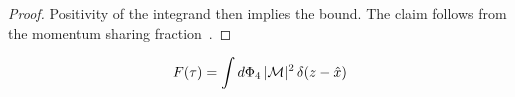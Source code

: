 \begin{proof}
Positivity of the integrand then implies the bound. The claim follows
from the momentum sharing
fraction~\cite{TPC:1653-LLAMA-Latent-Lorentz-Invariant-Angular-Ordered-Model-Agnostic-Amplitudes-September-25-2026}.
\end{proof}

\begin{equation}
  F(\tau) = \int d\Phi_{4} \, |\mathcal{M}|^2 \, \delta(z - \hat{x})
  \label{eq:5}
\end{equation}

